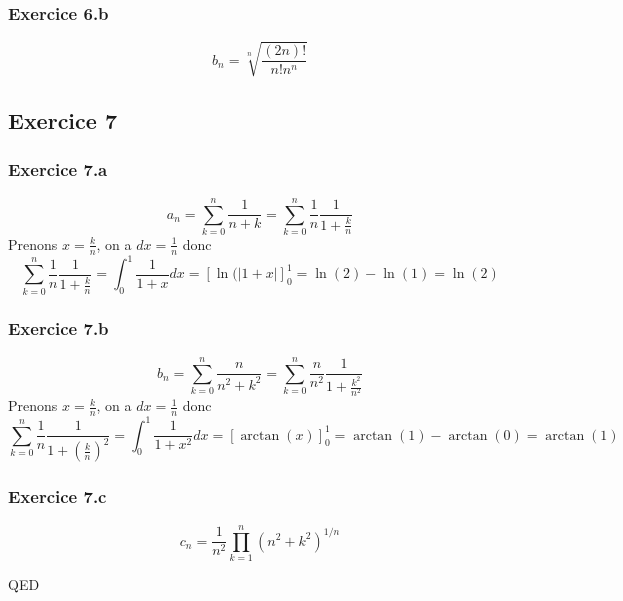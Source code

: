 \documentclass[]{book}
\theoremstyle{definition}
\begin{document}
\subsubsection*{Exercice 6.b}
$$b_n = \sqrt[n]{\frac{(2n)!}{n!n^n}}$$


\subsection*{Exercice 7}
\subsubsection*{Exercice 7.a}
$$a_n = \sum_{k=0}^{n}\frac{1}{n+k} = \sum_{k=0}^{n}\frac{1}{n}\frac{1}{1+\frac{k}{n}}$$
Prenons $x=\frac{k}{n}$, on a $dx=\frac{1}{n}$ donc
$$\sum_{k=0}^{n}\frac{1}{n}\frac{1}{1+\frac{k}{n}} = \int_{0}^{1} \frac{1}{1+x}dx = \left[\ln(|1+x|\right]_{0}^{1} = \ln(2)-\ln(1) = \ln(2)$$

\subsubsection*{Exercice 7.b}
$$b_n = \sum_{k=0}^{n}\frac{n}{n^2+k^2} = \sum_{k=0}^{n}\frac{n}{n^2}\frac{1}{1+\frac{k^2}{n^2}}$$
Prenons $x=\frac{k}{n}$, on a $dx=\frac{1}{n}$ donc
$$\sum_{k=0}^{n}\frac{1}{n}\frac{1}{1+\left(\frac{k}{n}\right)^2} = \int_{0}^{1} \frac{1}{1+x^2}dx = \left[\arctan(x)\right]_{0}^{1} = \arctan(1)-\arctan(0) = \arctan(1)$$

\subsubsection*{Exercice 7.c}
$$c_n = \frac{1}{n^2}\prod_{k=1}^{n}{(n^2+k^2)^{1/n}}$$

QED
\end{document}
